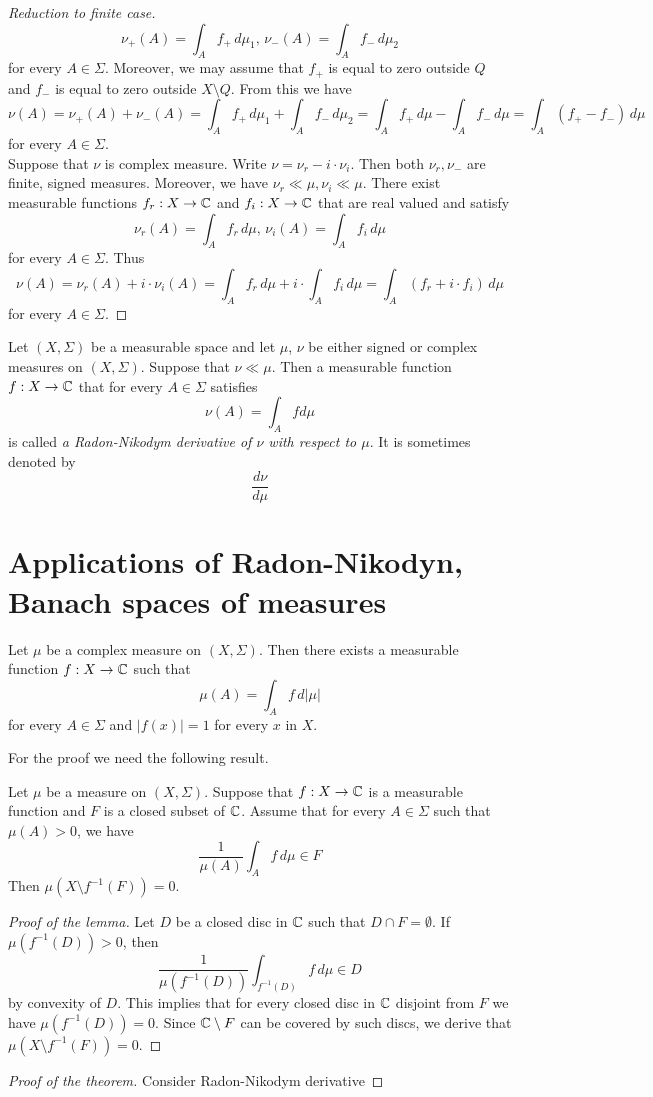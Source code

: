 \begin{proof}[Reduction to finite case]
$$\nu_+(A) = \int_Af_+\,d\mu_1,\,\nu_-(A) = \int_Af_-\,d\mu_2$$
for every $A\in \Sigma$. Moreover, we may assume that $f_+$ is equal to zero outside $Q$ and $f_-$ is equal to zero outside $X\setminus Q$. From this we have
$$\nu(A) = \nu_+(A) + \nu_-(A) = \int_Af_+\,d\mu_1 + \int_Af_-\,d\mu_2 =\int_Af_+\,d\mu - \int_Af_-\,d\mu = \int_A\left(f_+-f_-\right)\,d\mu $$
for every $A\in \Sigma$.\\
Suppose that $\nu$ is complex measure. Write $\nu = \nu_r - i\cdot \nu_i$. Then both $\nu_r, \nu_-$ are finite, signed measures. Moreover, we have $\nu_r\ll\mu,\nu_i\ll \mu$. There exist measurable functions $f_r:X\rightarrow {\mathbb C}$ and $f_i:X\rightarrow {\mathbb C}$ that are real valued and satisfy
$$\nu_r(A) = \int_Af_r\,d\mu,\,\nu_i(A) = \int_Af_i\,d\mu$$
for every $A\in \Sigma$. Thus
$$\nu(A) = \nu_r(A) + i\cdot \nu_i(A) = \int_Af_r\,d\mu + i\cdot \int_Af_i\,d\mu = \int_A\left(f_r+i\cdot f_i\right)\,d\mu$$
for every $A\in \Sigma$.
\end{proof}

\begin{definition}
Let $(X,\Sigma)$ be a measurable space and let $\mu$, $\nu$ be either signed or complex measures on $(X,\Sigma)$. Suppose that $\nu \ll \mu$. Then a measurable function $f:X\rightarrow {\mathbb C}$ that for every $A\in \Sigma$ satisfies
$$\nu(A) = \int_A f d\mu$$
is called \textit{a Radon-Nikodym derivative of $\nu$ with respect to $\mu$}. It is sometimes denoted by 
$$\frac{d\nu}{d\mu}$$
\end{definition}

\section{Applications of Radon-Nikodyn, Banach spaces of measures}

\begin{theorem}
Let $\mu$ be a complex measure on $(X,\Sigma)$. Then there exists a measurable function $f:X\rightarrow {\mathbb C}$ such that
$$\mu(A) = \int_Af\,d|\mu|$$
for every $A\in \Sigma$ and $|f(x)|=1$ for every $x$ in $X$.
\end{theorem}
\noindent
For the proof we need the following result.

\begin{lemma}\label{lemma:convexvaluesofintegral}
Let $\mu$ be a measure on $(X,\Sigma)$. Suppose that $f:X\rightarrow {\mathbb C}$ is a measurable function and $F$ is a closed subset of ${\mathbb C}$. Assume that for every $A\in \Sigma$ such that $\mu(A)>0$, we have
$$\frac{1}{\mu(A)}\int_A f\,d\mu \in F$$
Then $\mu\left(X\setminus f^{-1}(F)\right)=0$.
\end{lemma}
\begin{proof}[Proof of the lemma]
Let $D$ be a closed disc in ${\mathbb C}$ such that $D\cap F = \emptyset$. If $\mu\left(f^{-1}(D)\right) > 0$, then
$$\frac{1}{\mu\left(f^{-1}(D)\right)}\int_{f^{-1}(D)}f\,d\mu \in D$$
by convexity of $D$. This implies that for every closed disc in ${\mathbb C}$ disjoint from $F$ we have $\mu\left(f^{-1}(D)\right) = 0$. Since ${\mathbb C}\setminus F$ can be covered by such discs, we derive that $\mu\left(X\setminus f^{-1}(F)\right)=0$.
\end{proof}

\begin{proof}[Proof of the theorem]
Consider Radon-Nikodym derivative 
\end{proof}

\small



